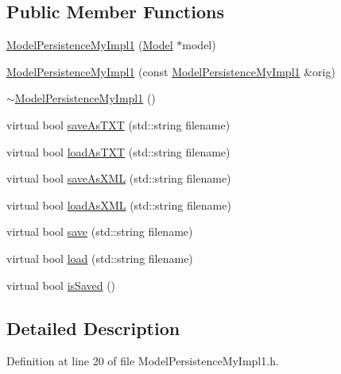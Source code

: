 \subsection*{Public Member Functions}
\begin{DoxyCompactItemize}
\item 
\hyperlink{class_model_persistence_my_impl1_a1f1c3099ee5470514ac021fbe8f6fac0}{Model\-Persistence\-My\-Impl1} (\hyperlink{class_model}{Model} $\ast$model)
\item 
\hyperlink{class_model_persistence_my_impl1_a3df2056ec9c57daea05630b3df1439b8}{Model\-Persistence\-My\-Impl1} (const \hyperlink{class_model_persistence_my_impl1}{Model\-Persistence\-My\-Impl1} \&orig)
\item 
\hyperlink{class_model_persistence_my_impl1_ab84fa247d7415d856141a8932502c362}{$\sim$\-Model\-Persistence\-My\-Impl1} ()
\item 
virtual bool \hyperlink{class_model_persistence_my_impl1_a367b40dfac801508f75a3176f7b40c6a}{save\-As\-T\-X\-T} (std\-::string filename)
\item 
virtual bool \hyperlink{class_model_persistence_my_impl1_aa4cf0301bf21bc177eee3e9f9320c382}{load\-As\-T\-X\-T} (std\-::string filename)
\item 
virtual bool \hyperlink{class_model_persistence_my_impl1_a0a4c157a22510a188c4b76324ea666b0}{save\-As\-X\-M\-L} (std\-::string filename)
\item 
virtual bool \hyperlink{class_model_persistence_my_impl1_a9047bd5d2f72ef6978cf27a8df38b7b5}{load\-As\-X\-M\-L} (std\-::string filename)
\item 
virtual bool \hyperlink{class_model_persistence_my_impl1_ab24f2e3aea25d628748dd8b9e63d326a}{save} (std\-::string filename)
\item 
virtual bool \hyperlink{class_model_persistence_my_impl1_a5e35c3da319f209a8d2585ec6e781a45}{load} (std\-::string filename)
\item 
virtual bool \hyperlink{class_model_persistence_my_impl1_acd16398bec06d3e0dcaa9513f0be7766}{is\-Saved} ()
\end{DoxyCompactItemize}


\subsection{Detailed Description}


Definition at line 20 of file Model\-Persistence\-My\-Impl1.\-h.



